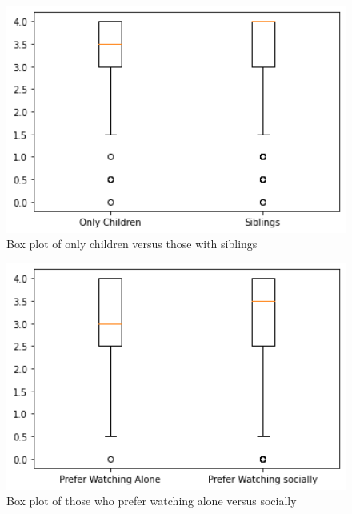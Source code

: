 \documentclass{article}
\begin{document}
\begin{figure}
\label{fig:foo}
\includegraphics[width=15cm]{data analysis project 1/boxplot question 5.png}
\caption{Box plot of only children versus those with siblings}
\end{figure}

\begin{figure}
\label{fig:foo}
\includegraphics[width=15cm]{data analysis project 1/boxplot question 7.png}
\caption{Box plot of those who prefer watching alone versus socially}
\end{figure}
\end{document}
